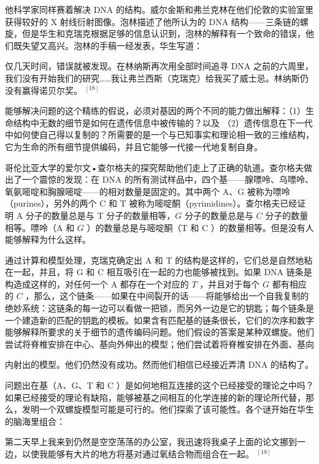 他科学家同样赛着解决 DNA 的结构。威尔金斯和弗兰克林在他们伦敦的实验室里获得较好的 X 射线衍射图像。泡林描述了他所认为的 DNA 结构——三条链的螺旋，但是华生和克瑞克根据足够的信息认识到，泡林的解释有一个致命的错误，他们既失望又高兴。泡林的手稿一经发表，华生写道：

\begin{displayquote}
仅几天时间，错误就被发现。在林纳斯再次用全部时间追寻 DNA 之前的六周里，我们没有开始我们的研究……我让弗兰西斯（克瑞克）给我买了威士忌。林纳斯仍没有赢得诺贝尔奖。 ${ }^{[18]}$
\end{displayquote}

能够解决问题的这个精练的假说，必须对基因的两个不同的能力做出解释：（1）生命结构中无数的细节是如何在遗传信息中被传输的？以及 （2）遗传信息在下一代中如何使自己得以复制的？所需要的是一个与已知事实和理论相一致的三维结构，它为生命的所有细节提供编码，并且它能够一代接一代地复制自身。

哥伦比亚大学的爱尔文•查尔格夫的探究帮助他们走上了正确的轨道。查尔格夫做出了一个震惊的发现：在 DNA 的所有测试样品中，四个基——腺嘌呤、乌嘌呤、氧氨嘧啶和胸腺嘧啶——的相对数量是固定的。其中两个 $\mathrm{A} 、 \mathrm{G}$ 被称为嘌呤（purines），另外的两个 C 和 T 被称为嘧啶酮（pyrimidines）。查尔格夫已经证明 A 分子的数量总是与 T 分子的数量相等，$G$ 分子的数量总是与 $C$ 分子的数量相等。嘌呤（A 和 $G$ ）的数量总是与嘧啶酮（T 和 C ）的数量相等。但是没有人能够解释为什么这样。

通过计算和模型处理，克瑞克确定出 A 和 T 的结构是这样的，它们总是自然地粘在一起，并且，将 G 和 C 相互吸引在一起的力也能够被找到。如果 DNA 链条是构造成这样的，对任何一个 A 都存在一个对应的 $T$ ，并且对于每个 $G$ 都有相应的 $C$ ，那么，这个链条——如果在中间裂开的话——将能够给出一个自我复制的绝妙系统：这链条的每一边可以看做一把锁，而另外一边是它的钥匙；每个链条是一个建造新的匹配的钥匙的模板。如果含有匹配基的链条很长，它们的次序和数字能够解释所要求的关于细节的遗传编码问题。他们假设的答案是某种双螺旋。他们尝试将脊椎安排在中心、基向外伸出的模型；他们尝试着将脊椎安排在外面、基向

内射出的模型。他们仍然没有成功。然而他们相信已经接近弄清 DNA 的结构了。

问题出在基（A、G、T 和 C ）是如何地相互连接的这个已经接受的理论之中吗？如果已经接受的理论有缺陷，能够被基之间相互的化学连接的新的理论所代替，那么，发明一个双螺旋模型可能是可行的。他们探索了该可能性。各个谜开始在华生的脑海里组合：

第二天早上我来到仍然是空空荡荡的办公室，我迅速将我桌子上面的论文挪到一边，以使我能够有大片的地方将基对通过氧结合物而组合在一起。 ${ }^{[19]}$


